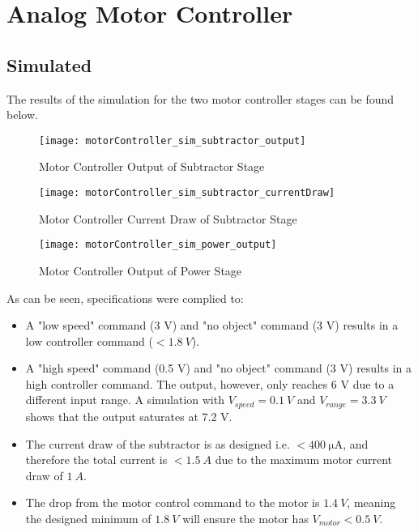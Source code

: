 \graphicspath{{content/3_results/figures}}
\section{Analog Motor Controller}

\subsection{Simulated}

The results of the simulation for the two motor controller stages can be found below.

\begin{figure}[!htb]
  \centering
  \texttt{[image: motorController\_sim\_subtractor\_output]}
  \caption{Motor Controller Output of Subtractor Stage}
  \label{fig:motorController_sim_subtractor_output}
\end{figure}

\begin{figure}[!htb]
  \centering
  \texttt{[image: motorController\_sim\_subtractor\_currentDraw]}
  \caption{Motor Controller Current Draw of Subtractor Stage}
  \label{fig:motorController_sim_subtractor_currentDraw}
\end{figure}

\begin{figure}[!htb]
    \centering
    \texttt{[image: motorController\_sim\_power\_output]}
    \caption{Motor Controller Output of Power Stage}
    \label{fig:motorController_sim_power_output}
  \end{figure}

As can be seen, specifications were complied to:
\begin{itemize}
    \item A "low speed" command (3 V) and "no object" command (3 V) results in a low controller command ($< \SI{1.8}{V}$).
    \item A "high speed" command (0.5 V) and "no object" command (3 V) results in a high controller command. The output, however, only reaches 6 V
          due to a different input range. A simulation with $V_{speed} = \SI{0.1}{V}$ and $V_{range} = \SI{3.3}{V}$ shows that the output saturates at 7.2 V.
    \item The current draw of the subtractor is as designed i.e. $< \SI{400}{\micro\ampere}$, and therefore the total current is $< \SI{1.5}{A}$ due to the
          maximum motor current draw of $\SI{1}{A}$.
    \item The drop from the motor control command to the motor is $\SI{1.4}{V}$, meaning the designed minimum of $\SI{1.8}{V}$ will ensure the motor
          has $V_{motor} < \SI{0.5}{V}$.
\end{itemize}

